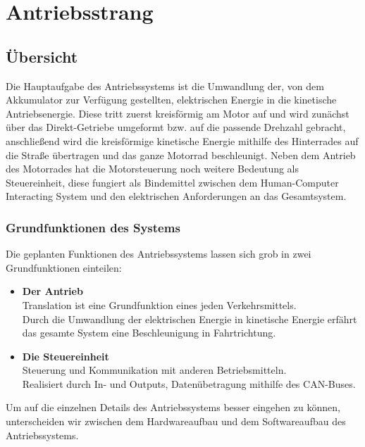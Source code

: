 \chapter{Antriebsstrang}


\section{Übersicht}
Die Hauptaufgabe des Antriebssystems ist die Umwandlung der, von dem Akkumulator zur Verfügung gestellten, elektrischen Energie in die kinetische Antriebsenergie. Diese tritt zuerst kreisförmig am Motor auf und wird zunächst über das Direkt-Getriebe umgeformt bzw. auf die passende Drehzahl gebracht, anschließend wird die kreisförmige kinetische Energie mithilfe des Hinterrades auf die Straße übertragen und das ganze Motorrad beschleunigt. Neben dem Antrieb des Motorrades hat die Motorsteuerung noch weitere Bedeutung als Steuereinheit, diese fungiert als Bindemittel zwischen dem Human-Computer Interacting System und den elektrischen Anforderungen an das Gesamtsystem.


\subsection{Grundfunktionen des Systems}
Die geplanten Funktionen des Antriebssystems lassen sich grob in zwei Grundfunktionen einteilen:

\begin{itemize}
	\item \textbf{Der Antrieb} 
	\\ \medskip Translation ist eine Grundfunktion eines jeden Verkehrsmittels.
	\\ Durch die Umwandlung der elektrischen Energie in kinetische Energie erfährt 
	\\ das gesamte System eine Beschleunigung in Fahrtrichtung.
	\medskip
	\item \textbf{Die Steuereinheit}
	\\ \medskip Steuerung und Kommunikation mit anderen Betriebsmitteln.
	\\ Realisiert durch In- und Outputs, Datenübetragung mithilfe des CAN-Buses. 
\end{itemize}

\vspace{5mm}

Um auf die einzelnen Details des Antriebssystems besser eingehen zu können, unterscheiden wir zwischen dem Hardwareaufbau und dem Softwareaufbau des Antriebssystems.

